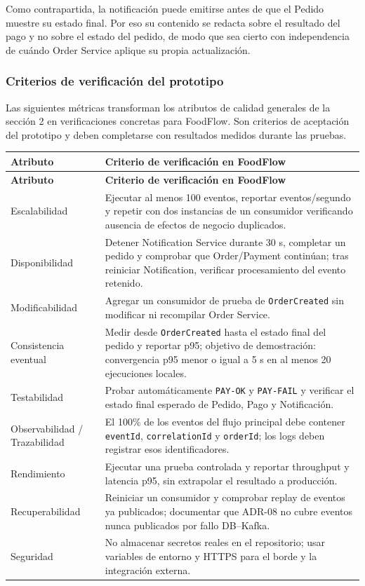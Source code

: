 \documentclass[12pt,a4paper]{article}
\begin{document}
Como contrapartida, la notificación puede emitirse antes de que el Pedido muestre su estado final. Por eso su contenido se redacta sobre el resultado del pago y no sobre el estado del pedido, de modo que sea cierto con independencia de cuándo Order Service aplique su propia actualización.

\subsubsection{Criterios de verificación del prototipo}

Las siguientes métricas transforman los atributos de calidad generales de la sección 2 en verificaciones concretas para FoodFlow. Son criterios de aceptación del prototipo y deben completarse con resultados medidos durante las pruebas.

\footnotesize
\begin{longtable}{P{0.20\textwidth} P{0.68\textwidth}}
\toprule
\textbf{Atributo} & \textbf{Criterio de verificación en FoodFlow} \\
\midrule
\endfirsthead
\toprule
\textbf{Atributo} & \textbf{Criterio de verificación en FoodFlow} \\
\midrule
\endhead
Escalabilidad & Ejecutar al menos 100 eventos, reportar eventos/segundo y repetir con dos instancias de un consumidor verificando ausencia de efectos de negocio duplicados. \\
Disponibilidad & Detener Notification Service durante 30 s, completar un pedido y comprobar que Order/Payment continúan; tras reiniciar Notification, verificar procesamiento del evento retenido. \\
Modificabilidad & Agregar un consumidor de prueba de \texttt{OrderCreated} sin modificar ni recompilar Order Service. \\
Consistencia eventual & Medir desde \texttt{OrderCreated} hasta el estado final del pedido y reportar p95; objetivo de demostración: convergencia p95 menor o igual a 5 s en al menos 20 ejecuciones locales. \\
Testabilidad & Probar automáticamente \texttt{PAY-OK} y \texttt{PAY-FAIL} y verificar el estado final esperado de Pedido, Pago y Notificación. \\
Observabilidad / Trazabilidad & El 100\% de los eventos del flujo principal debe contener \texttt{eventId}, \texttt{correlationId} y \texttt{orderId}; los logs deben registrar esos identificadores. \\
Rendimiento & Ejecutar una prueba controlada y reportar throughput y latencia p95, sin extrapolar el resultado a producción. \\
Recuperabilidad & Reiniciar un consumidor y comprobar replay de eventos ya publicados; documentar que ADR-08 no cubre eventos nunca publicados por fallo DB--Kafka. \\
Seguridad & No almacenar secretos reales en el repositorio; usar variables de entorno y HTTPS para el borde y la integración externa. \\
\bottomrule
\end{longtable}
\normalsize
\end{document}
